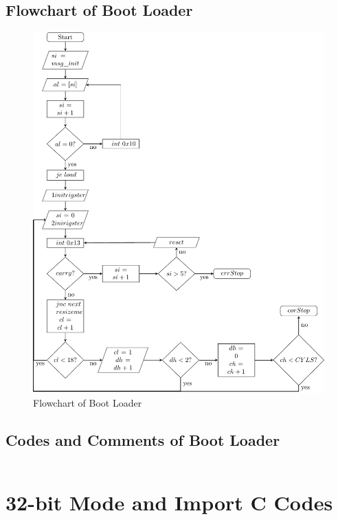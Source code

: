 \documentclass{swfcthesisp}
\begin{document}
\subsection{Flowchart of Boot Loader}
\label{sec:flowch-boot-load}
\begin{figure}[!ht]
  \centering
  \includegraphics[width=1.1\textwidth]{../FlowchartTex/1/flowchartp.pdf}
  \caption{Flowchart of Boot Loader}
  \label{fig:flowchart-of-boot-loader}
\end{figure}




\subsection{Codes and Comments of Boot Loader}
\label{sec:codes-comments}


\inputminted[linenos=true]{nasm}{./ipl10.nas}

\section{32-bit Mode and Import C Codes}
\end{document}
